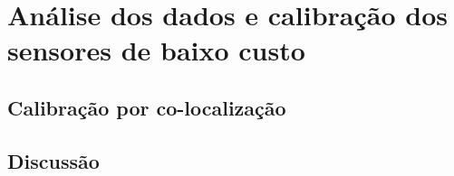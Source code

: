 \chapter{Análise dos dados e calibração dos sensores de baixo custo}\label{cap:field-monit-results}

\section{Calibração por co-localização}











\section{Discussão}